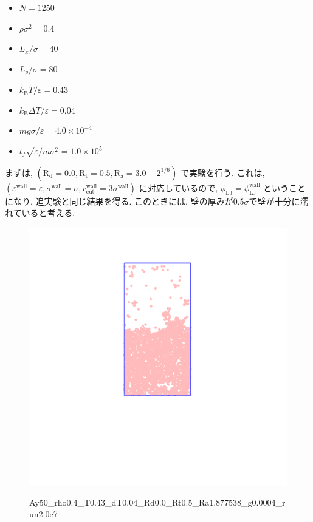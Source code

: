\documentclass[dvipdfmx]{jsarticle}
\numberwithin{equation}{subsection}
\begin{document}
\begin{itemize}
  \item $N = 1250$
  \item $\rho {\sigma}^2 = 0.4$
  \item $L_x / \sigma = 40$
  \item $L_y / \sigma = 80$
  \item $k_{\text{B}} T / \varepsilon = 0.43$
  \item $k_{\text{B}} \Delta T / \varepsilon = 0.04$
  \item $mg\sigma/\varepsilon = 4.0 \times 10^{-4}$
  \item $t_f \sqrt{\varepsilon / m \sigma^2} = 1.0 \times 10^{5}$
\end{itemize}

まずは, $(\text{R}_\text{d} = 0.0, \text{R}_\text{t} = 0.5, \text{R}_\text{a} = 3.0 - 2^{1/6})$ で実験を行う. これは, $(\varepsilon^{\text{wall}} = \varepsilon, \sigma^{\text{wall}} = \sigma, r^{\text{wall}}_{\text{cut}} = 3\sigma^{\text{wall}})$ に対応しているので, $\phi_{\text{LJ}} = \phi_{\text{LJ}}^{\text{wall}}$ ということになり, 追実験と同じ結果を得る. このときには, 壁の厚みが$0.5\sigma$で壁が十分に濡れていると考える.

\begin{figure}[H]
  \centering
  \href{https://youtu.be/fxn1mU1ZZFQ}{\includegraphics[scale=0.4]{image/2023-11-13T17:41:52.785__chi1.265_Ay50_rho0.4_T0.43_dT0.04_Rd0.0_Rt0.5_Ra1.877538_g0.0003999718779659611_run2.0e7_output.png}}
  \caption{Ay50\_rho0.4\_T0.43\_dT0.04\_Rd0.0\_Rt0.5\_Ra1.877538\_g0.0004\_run2.0e7}
\end{figure}
\end{document}

